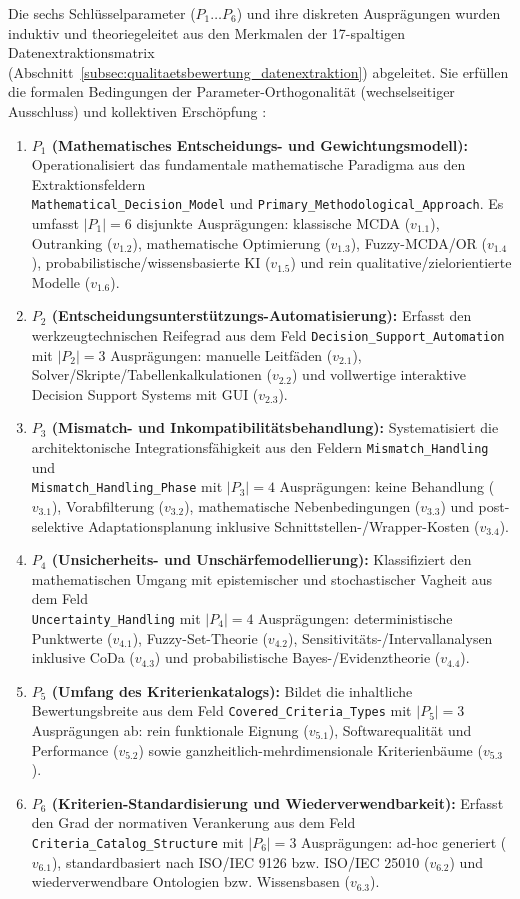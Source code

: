 Die sechs Schlüsselparameter ($P_1 \dots P_6$) und ihre diskreten Ausprägungen wurden induktiv und theoriegeleitet aus den Merkmalen der 17-spaltigen Datenextraktionsmatrix (Abschnitt~\ref{subsec:qualitaetsbewertung_datenextraktion}) abgeleitet. Sie erfüllen die formalen Bedingungen der Parameter-Orthogonalität (wechselseitiger Ausschluss) und kollektiven Erschöpfung \parencite[vgl.][S.~82 bis 83]{Z6N6V5L9}:
\begin{enumerate}[label=\textbf{\arabic*.}, leftmargin=*]
  \item \textbf{$P_1$ (Mathematisches Entscheidungs- und Gewichtungsmodell):} Operationalisiert das fundamentale mathematische Paradigma aus den Extraktionsfeldern \\ \texttt{Mathematical\_Decision\_Model} und \texttt{Primary\_Methodological\_Approach}. Es umfasst $|P_1| = 6$ disjunkte Ausprägungen: klassische MCDA ($v_{1.1}$), Outranking ($v_{1.2}$), mathematische Optimierung ($v_{1.3}$), Fuzzy-MCDA/OR ($v_{1.4}$), probabilistische/wissensbasierte KI ($v_{1.5}$) und rein qualitative/zielorientierte Modelle ($v_{1.6}$).
  \item \textbf{$P_2$ (Entscheidungsunterstützungs-Automatisierung):} Erfasst den werkzeugtechnischen Reifegrad aus dem Feld \texttt{Decision\_Support\_Automation} mit $|P_2| = 3$ Ausprägungen: manuelle Leitfäden ($v_{2.1}$), Solver/Skripte/Tabellenkalkulationen ($v_{2.2}$) und vollwertige interaktive Decision Support Systems mit GUI ($v_{2.3}$).
  \item \textbf{$P_3$ (Mismatch- und Inkompatibilitätsbehandlung):} Systematisiert die architektonische Integrationsfähigkeit aus den Feldern \texttt{Mismatch\_Handling} und \\ \texttt{Mismatch\_Handling\_Phase} mit $|P_3| = 4$ Ausprägungen: keine Behandlung ($v_{3.1}$), Vorabfilterung ($v_{3.2}$), mathematische Nebenbedingungen ($v_{3.3}$) und post-selektive Adaptationsplanung inklusive Schnittstellen-/Wrapper-Kosten ($v_{3.4}$).
  \item \textbf{$P_4$ (Unsicherheits- und Unschärfemodellierung):} Klassifiziert den mathematischen Umgang mit epistemischer und stochastischer Vagheit aus dem Feld \\ \texttt{Uncertainty\_Handling} mit $|P_4| = 4$ Ausprägungen: deterministische Punktwerte ($v_{4.1}$), Fuzzy-Set-Theorie ($v_{4.2}$), Sensitivitäts-/Intervallanalysen inklusive CoDa ($v_{4.3}$) und probabilistische Bayes-/Evidenztheorie ($v_{4.4}$).
  \item \textbf{$P_5$ (Umfang des Kriterienkatalogs):} Bildet die inhaltliche Bewertungsbreite aus dem Feld \texttt{Covered\_Criteria\_Types} mit $|P_5| = 3$ Ausprägungen ab: rein funktionale Eignung ($v_{5.1}$), Softwarequalität und Performance ($v_{5.2}$) sowie ganzheitlich-mehrdimensionale Kriterienbäume ($v_{5.3}$).
  \item \textbf{$P_6$ (Kriterien-Standardisierung und Wiederverwendbarkeit):} Erfasst den Grad der normativen Verankerung aus dem Feld \texttt{Criteria\_Catalog\_Structure} mit $|P_6| = 3$ Ausprägungen: ad-hoc generiert ($v_{6.1}$), standardbasiert nach ISO/IEC 9126 bzw. ISO/IEC 25010 ($v_{6.2}$) und wiederverwendbare Ontologien bzw. Wissensbasen ($v_{6.3}$).
\end{enumerate}

